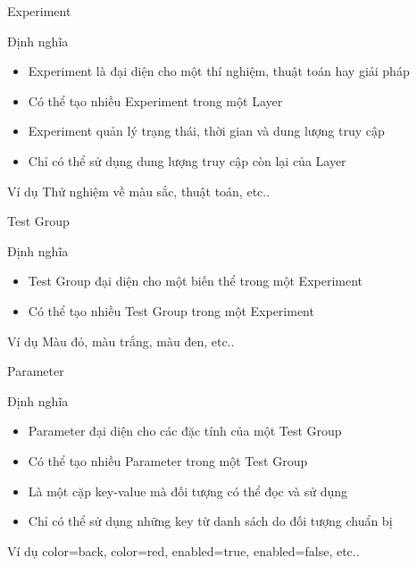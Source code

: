 \begin{frame}{Experiment}
	\begin{block}{Định nghĩa}
		\begin{itemize}
			\item Experiment là đại diện cho một thí nghiệm, thuật toán hay giải pháp
			\item Có thể tạo nhiều Experiment trong một Layer
			\item Experiment quản lý trạng thái, thời gian và dung lượng truy cập
			\item Chỉ có thể sử dụng dung lượng truy cập còn lại của Layer
		\end{itemize}
	\end{block}
	\begin{block}{Ví dụ}
		Thử nghiệm về màu sắc, thuật toán, etc..
	\end{block}
\end{frame}

\begin{frame}{Test Group}
	\begin{block}{Định nghĩa}
		\begin{itemize}
			\item Test Group đại diện cho một biến thể trong một Experiment
			\item Có thể tạo nhiều Test Group trong một Experiment
		\end{itemize}
	\end{block}
	\begin{block}{Ví dụ}
		Màu đỏ, màu trắng, màu đen, etc..
	\end{block}
\end{frame}

\begin{frame}{Parameter}
	\begin{block}{Định nghĩa}
		\begin{itemize}
			\item Parameter đại diện cho các đặc tính của một Test Group
			\item Có thể tạo nhiều Parameter trong một Test Group
			\item Là một cặp key-value mà đối tượng có thể đọc và sử dụng
			\item Chỉ có thể sử dụng những key từ danh sách do đối tượng chuẩn bị
		\end{itemize}
	\end{block}
	\begin{block}{Ví dụ}
		color=back, color=red, enabled=true, enabled=false, etc..
	\end{block}
\end{frame}
